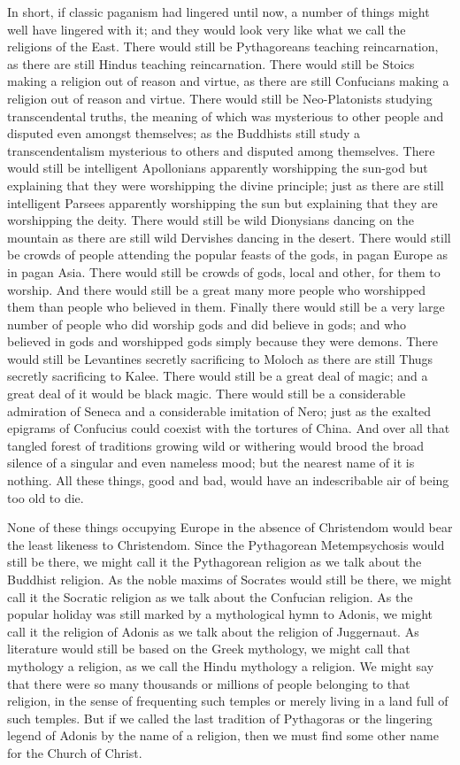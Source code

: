 In short, if classic paganism had lingered until now, a number of things might well have lingered with it; and they would look very like what we call the religions of the East. There would still be Pythagoreans teaching reincarnation, as there are still Hindus teaching reincarnation. There would still be Stoics making a religion out of reason and virtue, as there are still Confucians making a religion out of reason and virtue. There would still be Neo-Platonists studying transcendental truths, the meaning of which was mysterious to other people and disputed even amongst themselves; as the Buddhists still study a transcendentalism mysterious to others and disputed among themselves. There would still be intelligent Apollonians apparently worshipping the sun-god but explaining that they were worshipping the divine principle; just as there are still intelligent Parsees apparently worshipping the sun but explaining that they are worshipping the deity. There would still be wild Dionysians dancing on the mountain as there are still wild Dervishes dancing in the desert. There would still be crowds of people attending the popular feasts of the gods, in pagan Europe as in pagan Asia. There would still be crowds of gods, local and other, for them to worship. And there would still be a great many more people who worshipped them than people who believed in them. Finally there would still be a very large number of people who did worship gods and did believe in gods; and who believed in gods and worshipped gods simply because they were demons. There would still be Levantines secretly sacrificing to Moloch as there are still Thugs secretly sacrificing to Kalee. There would still be a great deal of magic; and a great deal of it would be black magic. There would still be a considerable admiration of Seneca and a considerable imitation of Nero; just as the exalted epigrams of Confucius could coexist with the tortures of China. And over all that tangled forest of traditions growing wild or withering would brood the broad silence of a singular and even nameless mood; but the nearest name of it is nothing. All these things, good and bad, would have an indescribable air of being too old to die.

None of these things occupying Europe in the absence of Christendom would bear the least likeness to Christendom. Since the Pythagorean Metempsychosis would still be there, we might call it the Pythagorean religion as we talk about the Buddhist religion. As the noble maxims of Socrates would still be there, we might call it the Socratic religion as we talk about the Confucian religion. As the popular holiday was still marked by a mythological hymn to Adonis, we might call it the religion of Adonis as we talk about the religion of Juggernaut. As literature would still be based on the Greek mythology, we might call that mythology a religion, as we call the Hindu mythology a religion. We might say that there were so many thousands or millions of people belonging to that religion, in the sense of frequenting such temples or merely living in a land full of such temples. But if we called the last tradition of Pythagoras or the lingering legend of Adonis by the name of a religion, then we must find some other name for the Church of Christ.

